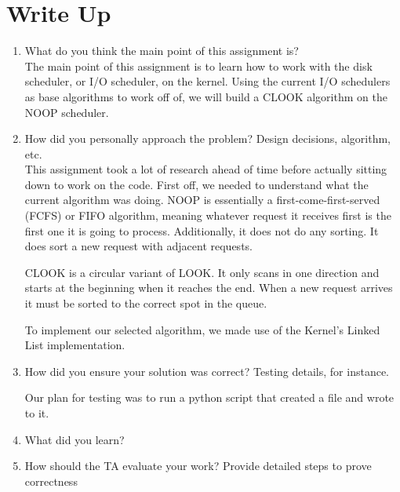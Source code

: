 \documentclass[letterpaper,10pt,draftclsnofoot,onecolumn,titlepage]{IEEEtran}
\begin{document}
\section{Write Up}
\begin{enumerate}
                \item What do you think the main point of this assignment is? \\
The main point of this assignment is to learn how to work with the disk scheduler, or I/O scheduler, on the kernel. 
Using the current I/O schedulers as base algorithms to work off of, we will build a CLOOK algorithm on the NOOP scheduler. 
                \item How did you personally approach the problem? Design decisions, algorithm, etc. \\
This assignment took a lot of research ahead of time before actually sitting down to work on the code. 
First off, we needed to understand what the current algorithm was doing. 
NOOP is essentially a first-come-first-served (FCFS) or FIFO algorithm, meaning whatever request it receives first is the first one it is going to process. 
Additionally, it does not do any sorting. It does sort a new request with adjacent requests. 

CLOOK is a circular variant of LOOK. It only scans in one direction and starts at the beginning when it reaches the end. When a new request arrives it must 
be sorted to the correct spot in the queue.

To implement our selected algorithm, we made use of the Kernel's Linked List implementation. 
                \item How did you ensure your solution was correct? Testing details, for instance.

Our plan for testing was to run a python script that created a file and wrote to it. 
                \item What did you learn?
                \item How should the TA evaluate your work? Provide detailed steps to prove correctness 
\end{enumerate}
\end{document}
